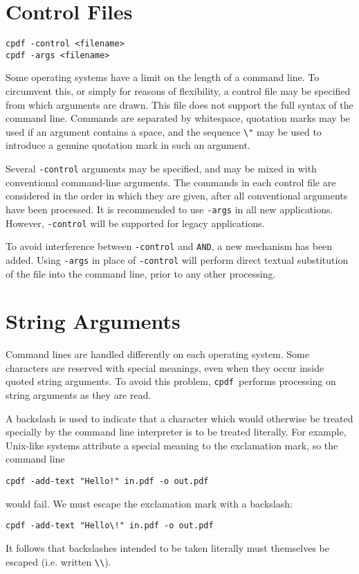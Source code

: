 \documentclass{book}
\newcommand{\cpdf}{\texttt{cpdf}}
\begin{document}
\section{Control Files}
\begin{framed}
  \noindent\small\verb!cpdf -control <filename>!\\
  \noindent\small\verb!cpdf -args <filename>!
\end{framed}

Some operating systems have a limit on the length of a command line. To
circumvent this, or simply for reasons of flexibility, a control file may be
specified from which arguments are drawn. This file does not support the full
syntax of the command line. Commands are separated by whitespace, quotation
marks may be used if an argument contains a space, and the sequence \verb!\"!
may be used to introduce a genuine quotation mark in such an argument.

Several \verb!-control! arguments may be specified, and may be mixed in with
conventional command-line arguments. The commands in each control file are
considered in the order in which they are given, after all conventional
arguments have been processed. It is recommended to use \texttt{-args} in all new applications. However, \texttt{-control} will be supported for legacy applications.

To avoid interference between \texttt{-control} and \texttt{AND}, a new mechanism has been added. Using \texttt{-args} in place of \texttt{-control} will perform direct textual substitution of the file into the command line, prior to any other processing.


\section{String Arguments}
Command lines are handled differently on each operating system. Some
characters are reserved with special meanings, even when they occur inside
quoted string arguments. To avoid this problem, \cpdf\ performs processing on
string arguments as they are read.

A backslash is used to indicate that a character which would otherwise be
treated specially by the command line interpreter is to be treated literally. For
example, Unix-like systems attribute a special meaning to the exclamation mark, so
the command line
\begin{framed}
 \small\verb?cpdf -add-text "Hello!" in.pdf -o out.pdf?
\end{framed}
\noindent would fail. We must escape the exclamation mark with a backslash:
\begin{framed}
 \small\verb?cpdf -add-text "Hello\!" in.pdf -o out.pdf?
\end{framed}
\noindent It follows that backslashes intended to be taken literally must themselves be
escaped (i.e. written \verb!\\!).
\end{document}

